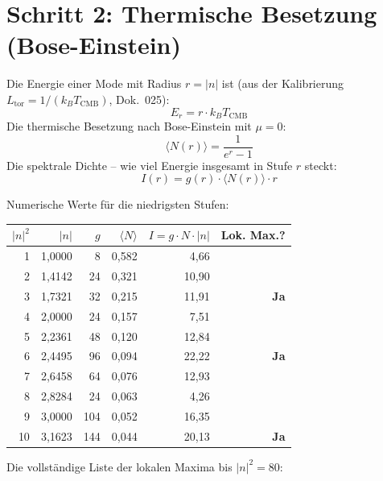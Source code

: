 \section{Schritt 2: Thermische Besetzung (Bose-Einstein)}

Die Energie einer Mode mit Radius $r = |n|$ ist (aus der Kalibrierung
$L_\mathrm{tor} = 1/(k_B T_\mathrm{CMB})$, Dok.~025):
\[
  E_r = r \cdot k_B T_\mathrm{CMB}
\]
Die thermische Besetzung nach Bose-Einstein mit $\mu = 0$:
\[
  \langle N(r) \rangle = \frac{1}{e^r - 1}
\]
Die spektrale Dichte -- wie viel Energie insgesamt in Stufe $r$ steckt:
\[
  \boxed{I(r) = g(r) \cdot \langle N(r) \rangle \cdot r}
\]

Numerische Werte für die niedrigsten Stufen:

\begin{center}
\begin{tabular}{rrrrrr}
\toprule
$|n|^2$ & $|n|$ & $g$ & $\langle N\rangle$ & $I = g\cdot N\cdot |n|$ & Lok. Max.? \\
\midrule
1  & 1{,}0000 & 8   & 0{,}582 & 4{,}66  & \\
2  & 1{,}4142 & 24  & 0{,}321 & 10{,}90 & \\
3  & 1{,}7321 & 32  & 0{,}215 & 11{,}91 & \textbf{Ja} \\
4  & 2{,}0000 & 24  & 0{,}157 & 7{,}51  & \\
5  & 2{,}2361 & 48  & 0{,}120 & 12{,}84 & \\
6  & 2{,}4495 & 96  & 0{,}094 & 22{,}22 & \textbf{Ja} \\
7  & 2{,}6458 & 64  & 0{,}076 & 12{,}93 & \\
8  & 2{,}8284 & 24  & 0{,}063 & 4{,}26  & \\
9  & 3{,}0000 & 104 & 0{,}052 & 16{,}35 & \\
10 & 3{,}1623 & 144 & 0{,}044 & 20{,}13 & \textbf{Ja} \\
\bottomrule
\end{tabular}
\end{center}

Die vollständige Liste der lokalen Maxima bis $|n|^2 = 80$:

